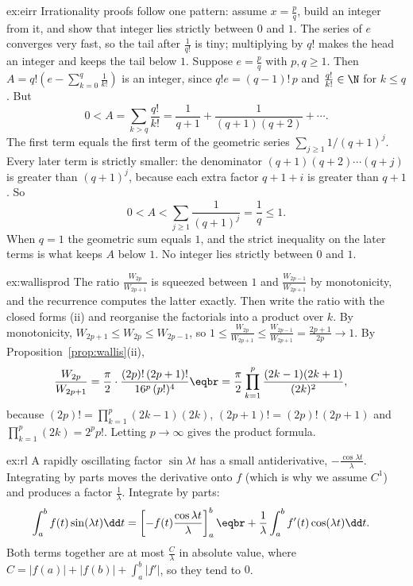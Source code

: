 \begin{solution}{ex:eirr}
\idea Irrationality proofs follow one pattern: assume $x=\frac pq$, build an integer from it, and show that integer lies strictly between $0$ and $1$. The series of $e$ converges very fast, so the tail after $\frac1{q!}$ is tiny; multiplying by $q!$ makes the head an integer and keeps the tail below $1$.
\writeup Suppose $e=\frac pq$ with $p,q\ge1$. Then $A=q!\left(e-\sum_{k=0}^q\frac1{k!}\right)$ is an integer, since $q!e=(q-1)!\,p$ and $\frac{q!}{k!}\in\N$ for $k\le q$. But
\[
0<A=\sum_{k>q}\frac{q!}{k!}=\frac1{q+1}+\frac1{(q+1)(q+2)}+\cdots.
\]
The first term equals the first term of the geometric series $\sum_{j\ge1}1/(q+1)^j$. Every later term is strictly smaller: the denominator $(q+1)(q+2)\cdots(q+j)$ is greater than $(q+1)^j$, because each extra factor $q+1+i$ is greater than $q+1$. So
\[
0<A<\sum_{j\ge1}\frac1{(q+1)^j}=\frac1q\le1.
\]
When $q=1$ the geometric sum equals $1$, and the strict inequality on the later terms is what keeps $A$ below $1$. No integer lies strictly between $0$ and $1$.
\end{solution}

\begin{solution}{ex:wallisprod}
\idea The ratio $\frac{W_{2p}}{W_{2p+1}}$ is squeezed between $1$ and $\frac{W_{2p-1}}{W_{2p+1}}$ by monotonicity, and the recurrence computes the latter exactly. Then write the ratio with the closed forms (ii) and reorganise the factorials into a product over $k$.
\writeup By monotonicity, $W_{2p+1}\le W_{2p}\le W_{2p-1}$, so $1\le\frac{W_{2p}}{W_{2p+1}}\le\frac{W_{2p-1}}{W_{2p+1}}=\frac{2p+1}{2p}\to1$. By Proposition~\ref{prop:wallis}(ii),
\[
\begin{aligned}\frac{W_{2p}}{W_{2p+1}}&=\frac\pi2\cdot\frac{(2p)!\,(2p+1)!}{16^p\,(p!)^4}\eqbr=\frac\pi2\prod_{k=1}^p\frac{(2k-1)(2k+1)}{(2k)^2},\end{aligned}
\]
because $(2p)!=\prod_{k=1}^p(2k-1)(2k)$, $(2p+1)!=(2p)!\,(2p+1)$ and $\prod_{k=1}^p(2k)=2^pp!$. Letting $p\to\infty$ gives the product formula.
\end{solution}

\begin{solution}{ex:rl}
\idea A rapidly oscillating factor $\sin\lambda t$ has a small antiderivative, $-\frac{\cos\lambda t}\lambda$. Integrating by parts moves the derivative onto $f$ (which is why we assume $C^1$) and produces a factor $\frac1\lambda$.
\writeup Integrate by parts:
\[\begin{aligned}\int_a^bf(t)\sin(\lambda t)\dd t&=\left[-f(t)\frac{\cos\lambda t}\lambda\right]_a^b\eqbr+\frac1\lambda\int_a^bf'(t)\cos(\lambda t)\dd t.\end{aligned}\]
Both terms together are at most $\frac C\lambda$ in absolute value, where $C=|f(a)|+|f(b)|+\int_a^b|f'|$, so they tend to $0$.
\end{solution}

